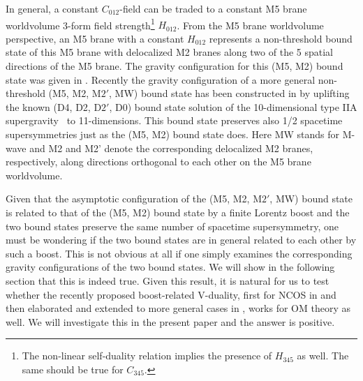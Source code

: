 \documentclass[a4paper,12pt]{article}
\begin{document}
In general, a constant $C_{012}$-field  can be traded to a constant M5
brane worldvolume
3-form field strength\footnote{The non-linear self-duality relation
implies the presence of $H_{345}$ as well. The same should be true for
$C_{345}$.} $H_{012}$. From the M5 brane worldvolume perspective, an M5
brane with a constant $H_{012}$ represents a non-threshold bound state
of this M5 brane with delocalized M2 branes along two of the 5 spatial
directions of the M5 brane. The gravity configuration for this (M5, M2)
bound state was given in \cite{Town}. Recently the gravity configuration
of a more general non-threshold (M5, M2, M$2'$, MW) bound state
 has been constructed in \cite{Berg3} by uplifting 
the known (D4, D2, D$2'$, D0) bound state solution 
of the 10-dimensional type IIA supergravity~\cite{Myer,HO} to 11-dimensions. 
This bound state preserves also 1/2 spacetime supersymmetries just
as the (M5, M2) bound state does. Here MW stands for  M-wave and 
M2 and M2' denote the corresponding delocalized M2 branes, respectively,
along directions orthogonal to each other on the M5 brane worldvolume.

Given that the asymptotic configuration of the (M5, M2, M$2'$, MW) bound
 state is related  to that of the (M5, M2) bound state by a finite
 Lorentz boost and the two bound states preserve the same number of
 spacetime supersymmetry, one must be wondering if the two bound states
are in general related to each other by such a boost. This is not
 obvious at all if one simply examines the corresponding gravity
 configurations of the two bound states.  We will show in the following
section that this is indeed true. Given this result, it is natural for
us to test whether the recently proposed boost-related V-duality, 
first for NCOS in \cite{CW} and then elaborated and extended to more 
general cases in \cite{CLW}, works for OM theory as well. We will 
investigate this in the present paper and the answer is positive.
\end{document}
